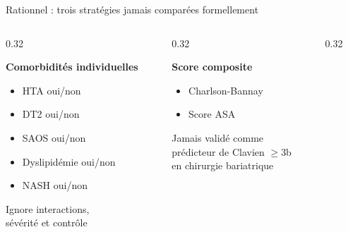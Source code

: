 \documentclass[aspectratio=169]{beamer}
\newcommand{\tightlist}{%
  \setlength{\itemsep}{1pt}\setlength{\parskip}{0pt}%
  \setlength{\parsep}{0pt}\setlength{\topsep}{2pt}}
\begin{document}
\begin{frame}[shrink=5]{Rationnel : trois stratégies jamais comparées formellement}
  \vspace{-0.3em}
  \begin{columns}[T]
    \begin{column}{0.32\textwidth}
      \begin{tcolorbox}[colback=bleupale,colframe=bleumed,
        title={\small\textbf{Approche 1}},fonttitle=\bfseries\small,top=3pt,bottom=3pt]
        \footnotesize\textbf{Comorbidités individuelles}\\[3pt]
        \begin{itemize}\tightlist
          \item HTA oui/non
          \item DT2 oui/non
          \item SAOS oui/non
          \item Dyslipidémie oui/non
          \item NASH oui/non
        \end{itemize}
        \vspace{3pt}
        \textcolor{orangemod}{\footnotesize Ignore interactions,\\sévérité et contrôle}
      \end{tcolorbox}
    \end{column}
    \begin{column}{0.32\textwidth}
      \begin{tcolorbox}[colback=bleupale,colframe=bleulair,
        title={\small\textbf{Approche 2}},fonttitle=\bfseries\small,top=3pt,bottom=3pt]
        \footnotesize\textbf{Score composite}\\[3pt]
        \begin{itemize}\tightlist
          \item Charlson-Bannay
          \item Score ASA
        \end{itemize}
        \vspace{3pt}
        \textcolor{orangemod}{\footnotesize Jamais validé comme\\prédicteur de Clavien $\geq$3b\\en chirurgie bariatrique}
      \end{tcolorbox}
    \end{column}
    \begin{column}{0.32\textwidth}
      \begin{tcolorbox}[colback=bleupale,colframe=vertdoux,
        title={\small\textbf{Approche 3}},fonttitle=\bfseries\small,top=3pt,bottom=3pt]

\end{tcolorbox}
\end{column}
\end{columns}
\end{frame}
\end{document}
